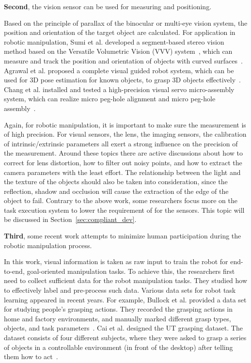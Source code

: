 \documentclass[journal,twoside,web]{ieeecolor}
\begin{document}
\textbf{Second}, the vision sensor can be used for measuring and positioning. 

Based on the principle of parallax of the binocular or multi-eye vision system, the position and orientation of the target object are calculated. 
For application in robotic manipulation, 
Sumi et al. developed a segment-based stereo vision method based on the Versatile Volumetric Vision (VVV) system~\cite{Tomitaa1998}, which can measure and track the position and orientation of objects with curved surfaces~\cite{Sumi2002Object}.
Agrawal et al. proposed a complete visual guided robot system, which can be used for 3D pose estimation for known objects, to grasp 3D objects effectively~\cite{Agrawal2009Vision}. 
Chang et al. installed and tested a high-precision visual servo micro-assembly system, which can realize micro peg-hole alignment and micro peg-hole assembly~\cite{Chang11}.

Again, for robotic manipulation, it is important to make sure the measurement is of high precision. For visual sensors, the lens, the imaging sensors, the calibration of intrinsic/extrinsic parameters all exert a strong influence on the precision of the measurement. Around these topics there are active discussions about how to correct for lens distortion, how to filter out noisy points, and how to extract the camera parameters with the least effort. The relationship between the light and the texture of the objects should also be taken into consideration, since the reflection, shadow and occlusion will cause the extraction of the edge of the object to fail. Contrary to the above work, some researchers focus more on the task execution system to lower the requirement of for the sensors. This topic will be discussed in Section~\ref{sec:compliant_dev}.

\textbf{Third}, some recent work attempts to minimize human participation during the robotic manipulation process. 

In this work, visual information is taken as raw input to train the robot for end-to-end, goal-oriented manipulation tasks.
To achieve this, the researchers first need to collect sufficient data for the robot manipulation tasks. 
They studied how to effectively label and pre-process such data. Various data sets for robot task learning appeared in recent years. 
For example, 
Bullock et al. provided a data set for studying people’s grasping actions. They recorded the grasping actions in home and factory environments, and manually marked different grasp types, objects, and task parameters~\cite{Bullock2015}. 
Cai et al. designed the UT grasping dataset. The dataset consists of four different subjects, where they were asked to grasp a series of objects in a controllable environment (in front of the desktop) after telling them how to act~\cite{Cai2015scalable}.
\end{document}
